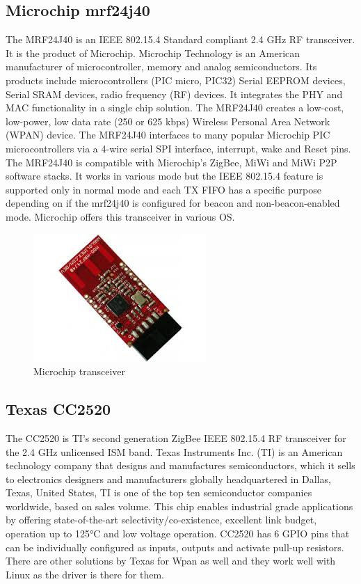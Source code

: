 \subsection{Microchip mrf24j40}
The MRF24J40 is an IEEE 802.15.4 Standard com­pliant 2.4 GHz RF transceiver. It is the product of Microchip. Microchip Technology is an American manufacturer of microcontroller, memory and analog semiconductors. Its products include microcontrollers (PIC micro, PIC32) Serial EEPROM devices, Serial SRAM devices, radio frequency (RF) devices. It integrates the PHY and MAC functionality in a single chip solution. The MRF24J40 creates a low-cost, low-power, low data rate (250 or 625 kbps) Wireless Personal Area Network (WPAN) device. The MRF24J40 interfaces to many popular Microchip PIC microcontrollers via a 4-wire serial SPI interface, interrupt, wake and Reset pins.\\ 
\noindent The MRF24J40 is compatible with Microchip's ZigBee, MiWi and MiWi P2P software stacks. It works in various mode but the IEEE 802.15.4 feature is supported only in normal mode and each TX FIFO has a specific purpose depending on if the mrf24j40 is configured for beacon and non-beacon-enabled mode. Microchip offers this transceiver in various OS. 
\begin{figure}[ht]
	\centering
	\includegraphics[scale=1]{images/microchip.jpg}
	\caption{Microchip transceiver}
\end{figure}
\subsection{Texas CC2520}
The CC2520 is TI's second generation ZigBee IEEE 802.15.4 RF transceiver for the 2.4 GHz unlicensed ISM band. Texas Instruments Inc. (TI) is an American technology company that designs and manufactures semiconductors, which it sells to electronics designers and manufacturers globally headquartered in Dallas, Texas, United States, TI is one of the top ten semiconductor companies worldwide, based on sales volume. This chip enables industrial grade applications by offering state-of-the-art selectivity/co-existence, excellent link budget, operation up to 125°C and low voltage operation. CC2520 has 6 GPIO pins that can be individually configured as inputs, outputs and activate pull-up resistors. There are other solutions by Texas for Wpan as well and they work well with Linux as the driver is there for them.

